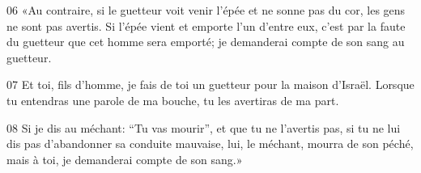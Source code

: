 
06 «Au contraire, si le guetteur voit venir l’épée et ne sonne pas du cor, les gens ne sont pas avertis. Si l’épée vient et emporte l’un d’entre eux, c’est par la faute du guetteur que cet homme sera emporté; je demanderai compte de son sang au guetteur.

07 Et toi, fils d’homme, je fais de toi un guetteur pour la maison d’Israël. Lorsque tu entendras une parole de ma bouche, tu les avertiras de ma part.

08 Si je dis au méchant: “Tu vas mourir”, et que tu ne l’avertis pas, si tu ne lui dis pas d’abandonner sa conduite mauvaise, lui, le méchant, mourra de son péché, mais à toi, je demanderai compte de son sang.»
